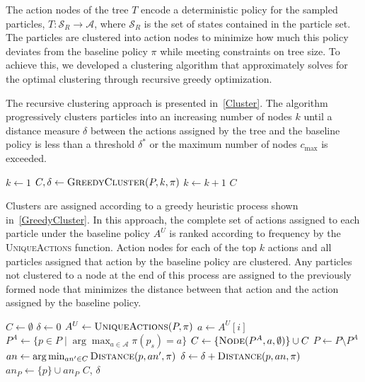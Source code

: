 \documentclass[letterpaper]{article} %
\begin{document}
The action nodes of the tree $T$ encode a deterministic policy for the sampled particles, $T: \mathcal{S}_R \to \mathcal{A}$, where $\mathcal{S}_R$ is the set of states contained in the particle set.
The particles are clustered into action nodes to minimize how much this policy deviates from the baseline policy $\pi$ while meeting constraints on tree size.
To achieve this, we developed a clustering algorithm that approximately solves for the optimal clustering through recursive greedy optimization.

The recursive clustering approach is presented in~\cref{Cluster}.
The algorithm progressively clusters particles into an increasing number of nodes $k$ until a distance measure $\delta$ between the actions assigned by the tree and the baseline policy is less than a threshold $\delta^*$ or the maximum number of nodes $c_{\max}$ is exceeded.
\begin{algorithm}[ht]
\caption{Recursive Cluster}\label{Cluster}
\begin{algorithmic}[1]
\State $k \gets 1$
\Repeat
\State $C, \delta \gets \textsc{GreedyCluster}(P, k, \pi)$
\State $k \gets k + 1$
\State \Return $C$
\EndProcedure
\end{algorithmic}
\end{algorithm}

Clusters are assigned according to a greedy heuristic process shown in~\cref{GreedyCluster}.
In this approach, the complete set of actions assigned to each particle under the baseline policy $A^U$ is ranked according to frequency by the \textsc{UniqueActions} function.
Action nodes for each of the top $k$ actions and all particles assigned that action by the baseline policy are clustered.
Any particles not clustered to a node at the end of this process are assigned to the previously formed node that minimizes the distance between that action and the action assigned by the baseline policy.
\begin{algorithm}[ht]
\caption{Greedy Cluster}\label{GreedyCluster}
\begin{algorithmic}[1]
\State $C \gets \emptyset$
\State $\delta \gets 0$
\State $A^U \gets \textsc{UniqueActions}(P, \pi)$
\State $a \gets A^U[i]$
\State $P^A \gets \{ p \in P \mid \arg\max_{a \in \mathcal{A}}\pi(p_s) = a \}$
\State $C \gets \{ \textsc{Node}(P^A, a, \emptyset) \} \cup C$
\State $P \gets P \setminus P^A$
\EndFor
{}
\State $an \gets \arg\min_{an' \in C} \textsc{Distance}(p, an', \pi)$
\State $\delta \gets \delta + \textsc{Distance}(p, an, \pi)$
\State $an_P \gets \{ p \} \cup an_P$
\EndFor
\State \Return $C$, $\delta$
\EndProcedure
\end{algorithmic}
\end{algorithm}
\end{document}
